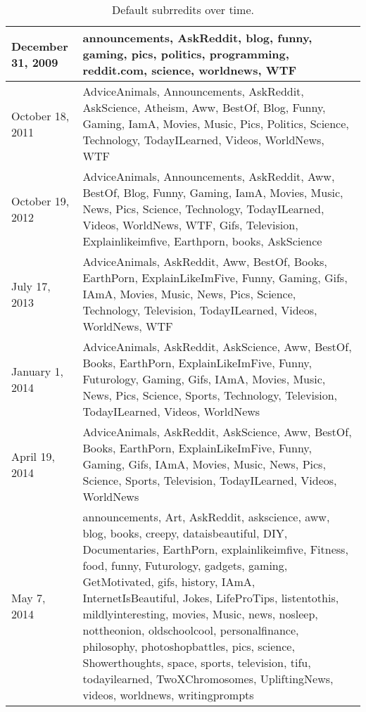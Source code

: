 \begin{table}[htbp]
\centering
\tabcolsep=0.11cm
\singlespacing
\fontsize{7pt}{8pt}\selectfont
\begin{tabular}{|>{\raggedright\centering\arraybackslash}m{1.5cm}|m{6.8cm}|}
\hline
December 31, 2009 & announcements, AskReddit, blog, funny, gaming, pics, politics, programming, reddit.com, science, worldnews, WTF \\ \hline
October 18, 2011 & AdviceAnimals, Announcements, AskReddit, AskScience, Atheism, Aww, BestOf, Blog, Funny, Gaming, IamA, Movies, Music, Pics, Politics, Science, Technology, TodayILearned, Videos, WorldNews, WTF \\ \hline
October 19, 2012 & AdviceAnimals, Announcements, AskReddit, Aww, BestOf, Blog, Funny, Gaming, IamA, Movies, Music, News, Pics, Science, Technology, TodayILearned, Videos, WorldNews, WTF, Gifs, Television, Explainlikeimfive, Earthporn, books, AskScience \\ \hline
July 17, 2013 & AdviceAnimals, AskReddit, Aww, BestOf, Books, EarthPorn, ExplainLikeImFive, Funny, Gaming, Gifs, IAmA, Movies, Music, News, Pics, Science, Technology, Television, TodayILearned, Videos, WorldNews, WTF \\ \hline
January 1, 2014 & AdviceAnimals, AskReddit, AskScience, Aww, BestOf, Books, EarthPorn, ExplainLikeImFive, Funny, Futurology, Gaming, Gifs, IAmA, Movies, Music, News, Pics, Science, Sports, Technology, Television, TodayILearned, Videos, WorldNews \\ \hline
April 19, 2014 & AdviceAnimals, AskReddit, AskScience, Aww, BestOf, Books, EarthPorn, ExplainLikeImFive, Funny, Gaming, Gifs, IAmA, Movies, Music, News, Pics, Science, Sports, Television, TodayILearned, Videos, WorldNews \\ \hline
May 7, 2014 & announcements, Art, AskReddit, askscience, aww, blog, books, creepy, dataisbeautiful, DIY, Documentaries, EarthPorn, explainlikeimfive, Fitness, food, funny, Futurology, gadgets, gaming, GetMotivated, gifs, history, IAmA, InternetIsBeautiful, Jokes, LifeProTips, listentothis, mildlyinteresting, movies, Music, news, nosleep, nottheonion, oldschoolcool, personalfinance, philosophy, photoshopbattles, pics, science, Showerthoughts, space, sports, television, tifu, todayilearned, TwoXChromosomes, UpliftingNews, videos, worldnews, writingprompts \\ \hline
\end{tabular}
\caption{Default subrredits over time.}
\end{table}

